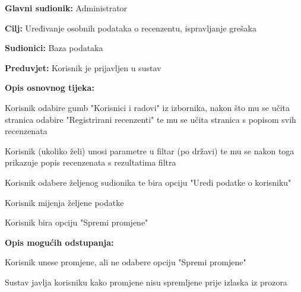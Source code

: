 					\noindent {}
					\begin{packed_item}
						\item \textbf{Glavni sudionik:} Administrator
						\item \textbf{Cilj:} Uređivanje osobnih podataka o recenzentu, ispravljanje grešaka
						\item \textbf{Sudionici:} Baza podataka
						\item \textbf{Preduvjet:} Korisnik je prijavljen u sustav
						
						\item \textbf{Opis osnovnog tijeka:} 
						\item[] \begin{packed_enum}
							\item Korisnik odabire gumb "Korisnici i radovi" iz izbornika, nakon što mu se učita stranica odabire "Registrirani recenzenti" te mu se učita stranica s popisom svih recenzenata
							\item Korisnik (ukoliko želi) unosi parametre u filtar (po državi) te mu se nakon toga prikazuje popis recenzenata s rezultatima filtra
							\item Korisnik odabere željenog sudionika te bira opciju "Uredi podatke o korisniku"
							\item Korisnik mijenja željene podatke
							\item Korisnik bira opciju "Spremi promjene"
						\end{packed_enum}
					
						\item \textbf{Opis mogućih odstupanja:}
						\item[] \begin{packed_enum}

							\item[2.a] Korisnik unese promjene, ali ne odabere opciju "Spremi promjene"
							\item[] \begin{packed_enum}
								\item[1.] Sustav javlja korisniku kako promjene nisu spremljene prije izlaska iz prozora
							\end{packed_enum}
						\end{packed_enum}
					\end{packed_item}

